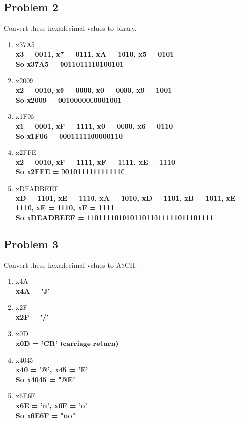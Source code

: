 \documentclass{article}
\begin{document}
\subsection*{Problem 2}
Convert these hexadecimal values to binary.
\begin{enumerate}[label=\alph*.]
    \item x37A5\\
    \textbf{x3 = 0011, x7 = 0111, xA = 1010, x5 = 0101\\
            So x37A5 = 0011011110100101}
    \item x2009\\
    \textbf{x2 = 0010, x0 = 0000, x0 = 0000, x9 = 1001\\
            So x2009 = 0010000000001001}
    \item x1F06\\
    \textbf{x1 = 0001, xF = 1111, x0 = 0000, x6 = 0110\\
            So x1F06 = 0001111100000110}
    \item x2FFE\\
    \textbf{x2 = 0010, xF = 1111, xF = 1111, xE = 1110\\
            So x2FFE = 0010111111111110}
    \item xDEADBEEF\\
    \textbf{xD = 1101, xE = 1110, xA = 1010, xD = 1101, xB = 1011, xE = 1110, xE = 1110, xF =   1111\\
            So xDEADBEEF = 11011110101011011011111011101111}
\end{enumerate}

\subsection*{Problem 3}
Convert these hexadecimal values to ASCII.
\begin{enumerate}[label=\alph*.]
    \item x4A\\
    \textbf{x4A = 'J'}
    \item x2F\\
    \textbf{x2F = '/'}
    \item x0D\\
    \textbf{x0D = 'CR' (carriage return)}
    \item x4045\\
    \textbf{x40 = '@', x45 = 'E'\\
            So x4045 = "@E"}
    \item x6E6F\\
    \textbf{x6E = 'n', x6F = 'o'\\
            So x6E6F = "no"}
\end{enumerate}
\end{document}
